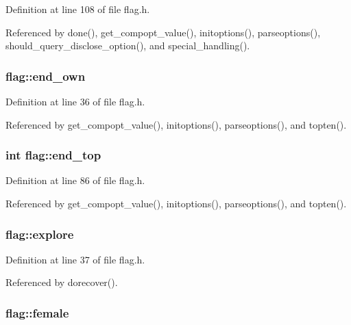 Definition at line 108 of file flag.\+h.



Referenced by done(), get\+\_\+compopt\+\_\+value(), initoptions(), parseoptions(), should\+\_\+query\+\_\+disclose\+\_\+option(), and special\+\_\+handling().

\hypertarget{structflag_a2fcee44ffb7da2cbd895e94fe4c44395}{
\subsubsection[{end\+\_\+own}]{ flag\+::end\+\_\+own}}\label{structflag_a2fcee44ffb7da2cbd895e94fe4c44395}


Definition at line 36 of file flag.\+h.



Referenced by get\+\_\+compopt\+\_\+value(), initoptions(), parseoptions(), and topten().

\hypertarget{structflag_a67a8b5adfb6745bca1cd79fd0165bf91}{
\subsubsection[{end\+\_\+top}]{\setlength{\rightskip}{0pt plus 5cm}int flag\+::end\+\_\+top}}\label{structflag_a67a8b5adfb6745bca1cd79fd0165bf91}


Definition at line 86 of file flag.\+h.



Referenced by get\+\_\+compopt\+\_\+value(), initoptions(), parseoptions(), and topten().

\hypertarget{structflag_a2158b7a81927608e938818f91aa8c1e7}{
\subsubsection[{explore}]{ flag\+::explore}}\label{structflag_a2158b7a81927608e938818f91aa8c1e7}


Definition at line 37 of file flag.\+h.



Referenced by dorecover().

\hypertarget{structflag_ae3f866c572c50c676ecadf8acccf0c50}{
\subsubsection[{female}]{ flag\+::female}}\label{structflag_ae3f866c572c50c676ecadf8acccf0c50}


